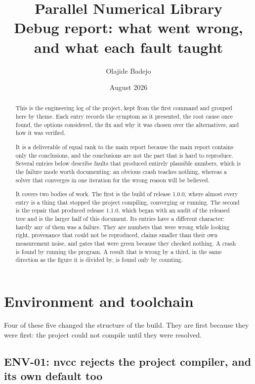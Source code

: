 \documentclass[11pt,a4paper]{report}
\title{\textbf{Parallel Numerical Library}\\[0.4em]
  \large Debug report: what went wrong, and what each fault taught}
\author{Olajide Badejo}
\date{August 2026}
\begin{document}
\maketitle

\begin{abstract}
\noindent
This is the engineering log of the project, kept from the first command and
grouped here by theme. Each entry records the symptom as it presented, the root
cause once found, the options considered, the fix and why it was chosen over the
alternatives, and how it was verified.

It is a deliverable of equal rank to the main report because the main report
contains only the conclusions, and the conclusions are not the part that is hard
to reproduce. Several entries below describe faults that produced entirely
plausible numbers, which is the failure mode worth documenting: an obvious crash
teaches nothing, whereas a solver that converges in one iteration for the wrong
reason will be believed.

It covers two bodies of work. The first is the build of release 1.0.0, where
almost every entry is a thing that stopped the project compiling, converging or
running. The second is the repair that produced release 1.1.0, which began with
an audit of the released tree and is the larger half of this document. Its
entries have a different character: hardly any of them was a failure. They are
numbers that were wrong while looking right, provenance that could not be
reproduced, claims smaller than their own measurement noise, and gates that were
green because they checked nothing. A crash is found by running the program. A
result that is wrong by a third, in the same direction as the figure it is
divided by, is found only by counting.
\end{abstract}

\tableofcontents

\chapter{Environment and toolchain}

Four of these five changed the structure of the build. They are first because
they were first: the project could not compile until they were resolved.

\section{ENV-01: nvcc rejects the project compiler, and its own default too}
\end{document}

